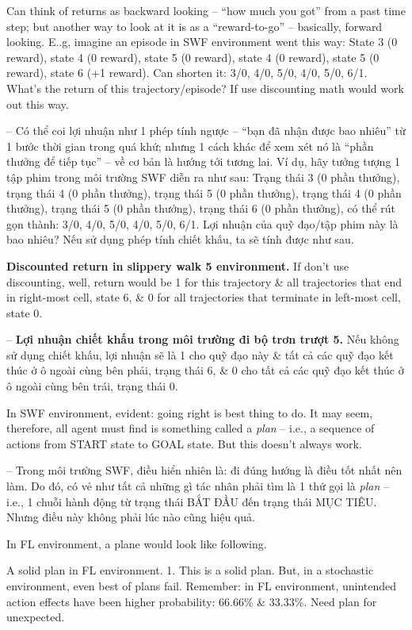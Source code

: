 \documentclass{article}
\begin{document}
\begin{itemize}
\begin{itemize}
        Can think of returns as backward looking -- ``how much you got'' from a past time step; but another way to look at it is as a ``reward-to-go'' -- basically, forward looking. E..g, imagine an episode in SWF environment went this way: State 3 (0 reward), state 4 (0 reward), state 5 (0 reward), state 4 (0 reward), state 5 (0 reward), state 6 (+1 reward). Can shorten it: 3/0, 4/0, 5/0, 4/0, 5/0, 6/1. What’s the return of this trajectory/episode? If use discounting math would work out this way.

        -- Có thể coi lợi nhuận như 1 phép tính ngược -- ``bạn đã nhận được bao nhiêu'' từ 1 bước thời gian trong quá khứ; nhưng 1 cách khác để xem xét nó là ``phần thưởng để tiếp tục'' -- về cơ bản là hướng tới tương lai. Ví dụ, hãy tưởng tượng 1 tập phim trong môi trường SWF diễn ra như sau: Trạng thái 3 (0 phần thưởng), trạng thái 4 (0 phần thưởng), trạng thái 5 (0 phần thưởng), trạng thái 4 (0 phần thưởng), trạng thái 5 (0 phần thưởng), trạng thái 6 (0 phần thưởng), có thể rút gọn thành: 3/0, 4/0, 5/0, 4/0, 5/0, 6/1. Lợi nhuận của quỹ đạo/tập phim này là bao nhiêu? Nếu sử dụng phép tính chiết khấu, ta sẽ tính được như sau.

        {\bf Discounted return in slippery walk 5 environment.} If don't use discounting, well, return would be 1 for this trajectory \& all trajectories that end in right-most cell, state 6, \& 0 for all trajectories that terminate in left-most cell, state 0.

        -- {\bf Lợi nhuận chiết khấu trong môi trường đi bộ trơn trượt 5.} Nếu không sử dụng chiết khấu, lợi nhuận sẽ là 1 cho quỹ đạo này \& tất cả các quỹ đạo kết thúc ở ô ngoài cùng bên phải, trạng thái 6, \& 0 cho tất cả các quỹ đạo kết thúc ở ô ngoài cùng bên trái, trạng thái 0.

        In SWF environment, evident: going right is best thing to do. It may seem, therefore, all agent must find is something called a {\it plan} -- i.e., a sequence of actions from START state to GOAL state. But this doesn't always work.

        -- Trong môi trường SWF, điều hiển nhiên là: đi đúng hướng là điều tốt nhất nên làm. Do đó, có vẻ như tất cả những gì tác nhân phải tìm là 1 thứ gọi là {\it plan} -- i.e., 1 chuỗi hành động từ trạng thái BẮT ĐẦU đến trạng thái MỤC TIÊU. Nhưng điều này không phải lúc nào cũng hiệu quả.

        In FL environment, a plane would look like following.

        {\sf A solid plan in FL environment.} 1. This is a solid plan. But, in a stochastic environment, even best of plans fail. Remember: in FL environment, unintended action effects have been higher probability: 66.66\% \& 33.33\%. Need plan for unexpected.


\end{itemize}
\end{itemize}
\end{document}

